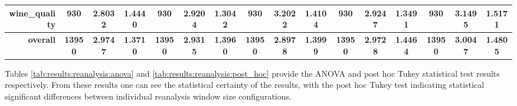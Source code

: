 \begin{table}[htbp]
{\begin{tabular}{rccccccccccccccc}
                  wine\_quality                       & 930                                     & \cellcolor[rgb]{ .776,  .937,  .808}\textcolor[rgb]{ 0,  .38,  0}{2.8032} & 1.4440          & 930                            & 2.9204                                                                    & 1.3042          & 930                             & 3.2022                                                                             & 1.4104          & 930                             & 2.9247                                                                    & 1.3491          & 930                             & 3.1495                                                                    & 1.5171          \\
                  \midrule
                  \textbf{overall}                    & \textbf{13950}                          & \textbf{2.9747}                                                           & \textbf{1.3710} & \textbf{13950}                 & \textbf{2.9315}                                                           & \textbf{1.3960} & \textbf{13950}                  & \cellcolor[rgb]{ .776,  .937,  .808}\textcolor[rgb]{ 0,  .38,  0}{\textbf{2.8978}} & \textbf{1.3999} & \textbf{13950}                  & \textbf{2.9728}                                                           & \textbf{1.4464} & \textbf{13950}                  & \textbf{3.0047}                                                           & \textbf{1.4805} \\
            \end{tabular}%
      }

\end{table}%

Tables \ref{tab:results:reanalysis:anova} and \ref{tab:results:reanalysis:post_hoc} provide the ANOVA and post hoc Tukey statistical test results respectively. From these results one can see the statistical certainty of the results, with the post hoc Tukey test indicating statistical significant differences between individual reanalysis window size configurations.

